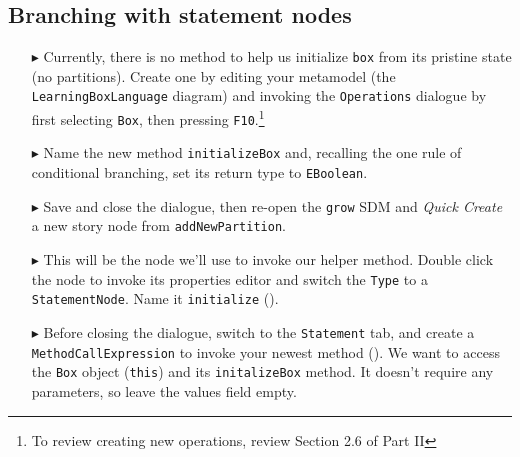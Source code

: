 \clearpage
\hypertarget{conBran vis}{}
\subsection{Branching with statement nodes}
\genHeader

\begin{itemize}

\item[$\blacktriangleright$] Currently, there is no method to help us initialize \texttt{box} from its pristine state (no partitions). Create one by editing
your metamodel (the \texttt{LearningBoxLanguage} diagram) and invoking the \texttt{Operations} dialogue by first selecting \texttt{Box}, then pressing
\texttt{F10}.\footnote{To review creating new operations, review Section 2.6 of Part II}

\item[$\blacktriangleright$] Name the new method \texttt{initializeBox} and, recalling the one rule of conditional branching, set its return type to
\texttt{EBoolean}.

\item[$\blacktriangleright$] Save and close the dialogue, then re-open the \texttt{grow} SDM and \emph{Quick Create} a new story node from
\texttt{addNewPartition}.

\item[$\blacktriangleright$] This will be the node we'll use to invoke our helper method. Double click the node to invoke its properties editor and switch the
\texttt{Type} to a \texttt{StatementNode}. Name it \texttt{initialize} ().

\item[$\blacktriangleright$] Before closing the dialogue, switch to the \texttt{Statement} tab, and create a \texttt{MethodCallExpression} to invoke your newest
method (). We want to access the \texttt{Box} object (\texttt{this}) and its \texttt{initalizeBox} method. It doesn't require any
parameters, so leave the values field empty. 

\begin{figure}[htbp]
   \centering
      \caption{}
\end{figure}
\FloatBarrier


\end{itemize}
